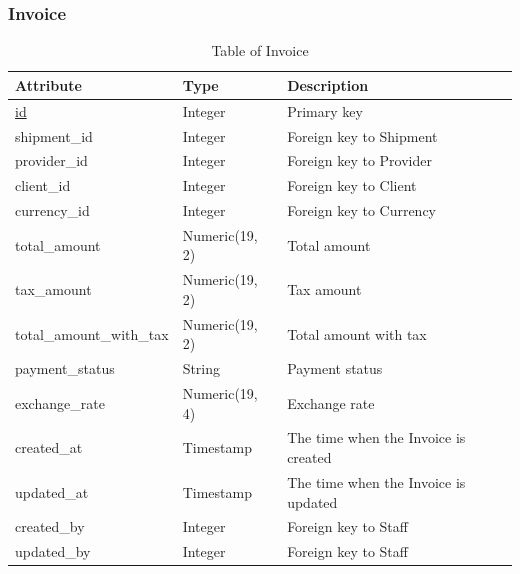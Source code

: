 \subsubsection{Invoice}
\begin{table}[H]
    \centering
    \begin{tabular}{|p{4cm}|p{3cm}|p{\dimexpr\textwidth-8.8cm}|} %
        \hline
        \rowcolor[HTML]{C0C0C0} 
        \textbf{Attribute} & \textbf{Type} & \textbf{Description} \\ \hline
        \underline{id} & Integer & Primary key \\ \hline
        shipment\_id & Integer & Foreign key to Shipment \\ \hline
        provider\_id & Integer & Foreign key to Provider \\ \hline
        client\_id & Integer & Foreign key to Client \\ \hline
        currency\_id & Integer & Foreign key to Currency \\ \hline
        total\_amount & Numeric(19, 2) & Total amount \\ \hline
        tax\_amount & Numeric(19, 2) & Tax amount \\ \hline
        total\_amount\_with\_tax & Numeric(19, 2) & Total amount with tax \\ \hline
        payment\_status & String & Payment status \\ \hline
        exchange\_rate & Numeric(19, 4) & Exchange rate \\ \hline
        created\_at & Timestamp & The time when the Invoice is created \\ \hline
        updated\_at & Timestamp & The time when the Invoice is updated \\ \hline
        created\_by & Integer & Foreign key to Staff \\ \hline
        updated\_by & Integer & Foreign key to Staff \\ \hline
    \end{tabular}
    \caption{Table of Invoice}
    \label{tab:invoice-table}
\end{table}

